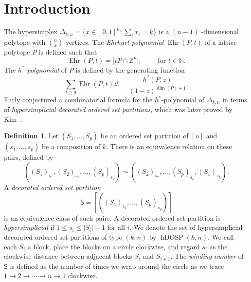 \documentclass[10pt,a4paper]{amsart}
\theoremstyle{plain}
\theoremstyle{definition}
\newtheorem{definition}[theorem]{Definition}
\newcommand{\Z}{\mathbb{Z}}
\newcommand{\N}{\mathbb{N}}
\newcommand{\hyp}{\Delta_{k,n}}
\newcommand{\dosp}{\mathsf{S}}
\DeclareMathOperator{\Ehr}{Ehr}
\DeclareMathOperator{\hDOSP}{hDOSP}
\begin{document}
\section{Introduction}
The hypersimplex $ \hyp = \{ x \in [0,1]^n: \sum_i x_i = k\} $ is a $ (n-1) $ -dimensional polytope with $ \binom{n}{k}
$ vertices. The \emph{Ehrhart polynomial} $ \Ehr(P,t) $ of a lattice polytope $ P $ is defined such that
\[
	\Ehr(P,t) = |tP \cap \Z^n|, \qquad \text{ for }t \in \N.
\]
The \emph{ $ h^* $-polynomial} of $ P $ is defined by the generating function
\[
	\sum_{t \ge 0} \Ehr(P,t) z^t = \frac{h^*(P,z)}{(1-z)^{\dim(P)+1}}.
\]
Early conjectured a combinatorial formula for the $ h^* $-polynomial of $ \hyp $ in terms of \emph{hypersimplicial
  decorated ordered set partitions}, which was later proved by Kim~\cite{Kim2020}.
\begin{definition}\label{def:dosp}
	Let $(S_1, \dots, S_p)$ be an ordered set partition of $ [n] $ and $(s_1, \dots, s_p)$ be a composition of $k$.
	There is an equivalence relation on these pairs, defined by
	\[
		((S_1)_{s_1},(S_2)_{s_2},\dots,(S_p)_{s_p}) \sim
		((S_2)_{s_2},\dots,(S_p)_{s_p},(S_1)_{s_1}).
	\]
	A \emph{decorated ordered set partition}
	\begin{equation}\label{eq:dosp}
		\dosp = [((S_1)_{s_1},\dots,(S_p)_{s_p})]
	\end{equation}
	is an equivalence class of such pairs.
	A decorated ordered set partition is \emph{hypersimplicial} if $ 1 \leq s_i \leq |S_i|-1 $ for all $ i $. We denote the set of hypersimplicial decorated
	ordered set partitions of type $ (k,n) $ by $ \hDOSP(k,n) $. We call each $ S_i $ a block, place the blocks on a
	circle clockwise, and regard $ s_i $ as the clockwise distance between adjacent blocks $ S_i $ and $ S_{i+1} $. The
	\emph{winding number} of $ \dosp $ is defined as the number of times we wrap around the circle as we trace $ 1 \to
		2 \to \cdots \to n \to 1 $ clockwise.
\end{definition}
\end{document}
